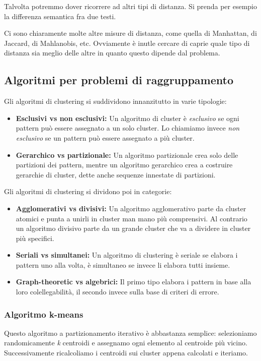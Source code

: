         Talvolta potremmo dover ricorrere ad altri tipi di distanza. Si prenda per esempio la differenza semantica fra due testi.
            
        Ci sono chiaramente molte altre misure di distanza, come quella di Manhattan, di Jaccard, di Mahlanobis, etc. Ovviamente è inutle cercare di caprie quale tipo di distanza sia meglio delle altre in quanto questo dipende dal problema.
            
    \subsection{Algoritmi per problemi di raggruppamento}
        Gli algoritmi di clustering si suddividono innanzitutto in varie tipologie:
        \begin{itemize}
            \item \textbf{Esclusivi vs non esclusivi:} Un algoritmo di cluster è \textit{esclusivo} se ogni pattern può essere assegnato a un solo cluster. Lo chiamiamo invece \textit{non esclusivo} se un pattern può essere assegnato a più cluster.
            \item \textbf{Gerarchico vs partizionale:} Un algoritmo partizionale crea solo delle partizioni dei pattern, mentre un algoritmo gerarchico crea a costruire gerarchie di cluster, dette anche sequenze innestate di partizioni.
        \end{itemize}
        
        Gli algoritmi di clustering si dividono poi in categorie:
        \begin{itemize}
            \item \textbf{Agglomerativi vs divisivi:} Un algoritmo agglomerativo parte da cluster atomici e punta a unirli in cluster man mano più comprensivi. Al contrario un algoritmo divisivo parte da un grande cluster che va a dividere in cluster più specifici.
            \item \textbf{Seriali vs simultanei:} Un algoritmo di clustering è seriale se elabora i pattern uno alla volta, è simultaneo se invece li elabora tutti insieme.
            \item \textbf{Graph-theoretic vs algebrici:} Il primo tipo elabora i pattern in base alla loro colellegabilità, il secondo invece sulla base di criteri di errore.
        \end{itemize}
        
        \subsubsection{Algoritmo k-means}
            Questo algoritmo a partizionamento iterativo è abbastanza semplice: selezioniamo randomicamente \textit{k} centroidi e assegnamo ogni elemento al centroide più vicino. Successivamente ricalcoliamo i centroidi sui cluster appena calcolati e iteriamo.
            
